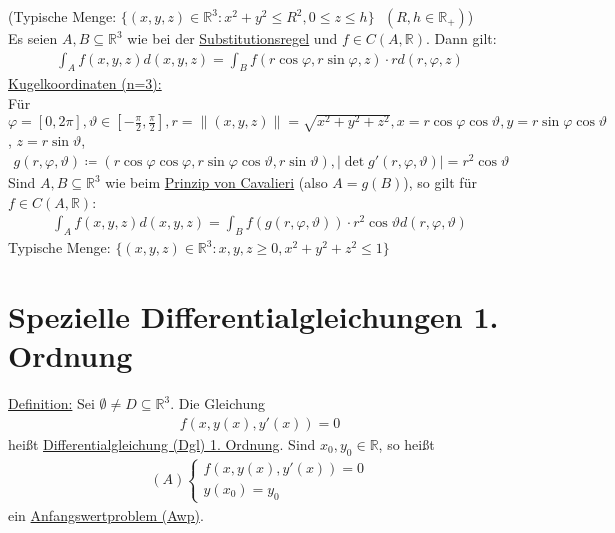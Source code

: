 \documentclass{article}
\begin{document}
(Typische Menge: $ \{ (x,y,z) \in \mathbb{R}^3: x^2+y^2 \leq R^2, 0 \leq z \leq h\} \text{ } (R,h \in \mathbb{R}_+)$)\\
Es seien $A,B \subseteq \mathbb{R}^3$ wie bei der \hyperref[sec: Sub]{Substitutionsregel} und $f \in C(A,\mathbb{R})$. Dann gilt: 
\begin{align*}
    \int_A f(x,y,z) d(x,y,z) = \int_B f(r \cos \varphi, r \sin \varphi, z) \cdot r d(r,\varphi,z)
\end{align*}
\underline{Kugelkoordinaten (n=3):} \\
Für $\varphi = [0,2\pi], \vartheta \in [-\frac{\pi}{2}, \frac{\pi}{2}], r=\lVert (x,y,z)\rVert = \sqrt{x^2+y^2+z^2}, x= r\cos \varphi \cos \vartheta, y=r \sin \varphi \cos \vartheta$,
$z=r \sin \vartheta$,
\begin{align*}
    g(r,\varphi,\vartheta) \coloneqq (r\cos \varphi \cos \varphi, r \sin \varphi \cos \vartheta, r \sin \vartheta), \lvert \det g'(r,\varphi,\vartheta)\rvert = r^2 \cos \vartheta
\end{align*}
Sind $A,B \subseteq \mathbb{R}^3$ wie beim \hyperref[sec: Cavalieri]{Prinzip von Cavalieri} (also $A=g(B)$), so gilt für $f \in C(A,\mathbb{R})$:
\begin{align*}
    \int_A f(x,y,z) d(x,y,z) = \int_B f(g(r,\varphi,\vartheta)) \cdot r^2 \cos \vartheta d(r,\varphi,\vartheta)
\end{align*}
Typische Menge: $\{ (x,y,z) \in \mathbb{R}^3: x,y,z \geq 0, x^2+y^2+z^2 \leq 1\}$

\section{Spezielle Differentialgleichungen 1. Ordnung}
\underline{Definition:} Sei $\emptyset \neq D \subseteq \mathbb{R}^3$. Die Gleichung
\begin{align*}
    f(x,y(x),y'(x)) = 0
\end{align*}
heißt \underline{Differentialgleichung (Dgl) 1. Ordnung}. Sind $x_0,y_0 \in \mathbb{R}$, so heißt
\begin{align*}
    (A) \begin{cases}
    f(x,y(x),y'(x)) = 0 \\
    y(x_0) = y_0
    \end{cases}
\end{align*}
ein \underline{Anfangswertproblem (Awp)}.
\end{document}
